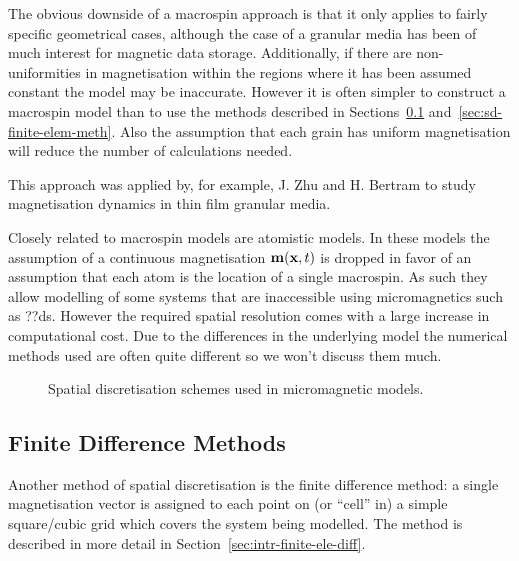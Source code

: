 The obvious downside of a macrospin approach is that it only applies to fairly specific geometrical cases, although the case of a granular media has been of much interest for magnetic data storage. Additionally, if there are non-uniformities in magnetisation within the regions where it has been assumed constant the model may be inaccurate. However it is often simpler to construct a macrospin model than to use the methods described in Sections~\ref{sec:sd-finite-diff-meth} and~\ref{sec:sd-finite-elem-meth}. Also the assumption that each grain has uniform magnetisation will reduce the number of calculations needed.

This approach was applied by, for example, J. Zhu and H. Bertram to study magnetisation dynamics in thin film granular media.\cite{Zhu1988}

Closely related to macrospin models are atomistic models\cite{Evans2014}.
In these models the assumption of a continuous magnetisation $\mathbf{m}(\mathbf{x}, t)$ is dropped in favor of an assumption that each atom is the location of a single macrospin.
As such they allow modelling of some systems that are inaccessible using micromagnetics such as ??ds.
However the required spatial resolution comes with a large increase in computational cost.
Due to the differences in the underlying model the numerical methods used are often quite different so we won't discuss them much.

\begin{figure}[h]
  \centering
  \caption{Spatial discretisation schemes used in micromagnetic models.}
  \label{fig:types-spat-discl}
\end{figure}


\subsection{Finite Difference Methods}
\label{sec:sd-finite-diff-meth}

Another method of spatial discretisation is the finite difference method: a single magnetisation vector is assigned to each point on (or ``cell'' in) a simple square/cubic grid which covers the system being modelled. The method is described in more detail in Section~\ref{sec:intr-finite-ele-diff}.

